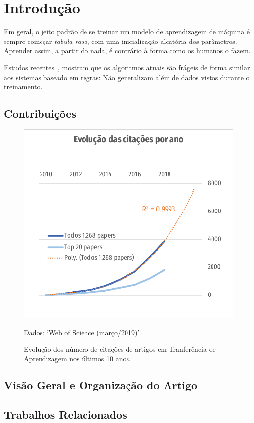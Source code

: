 \documentclass[sigconf]{acmart}
\newcommand{\source}[2]{\raggedleft{}\vspace*{-7mm}\caption*{ \scriptsize{{#1}: {`#2'}}}}
\begin{document}
\section{Introdução} 
  Em geral, o jeito padrão de se treinar um modelo de aprendizagem de máquina é sempre começar \emph{tabula rasa}, com uma inicialização aleatória dos parâmetros. Aprender assim, a partir do nada, é contrário à forma como os humanos o fazem.

  Estudos recentes~\cite{JiaLian2017, BelinkovBisk2018}, mostram que os algoritmos atuais são frágeis de forma similar aos sistemas baseado em regras: Não generalizam além de dados vistos durante o treinamento.
  \lipsum[1]
  \subsection{Contribuições}
  \lipsum[3]
  \begin{figure}[h]
    \includegraphics[width=\columnwidth]{citacoes_por_ano2.pdf}
    \source{Dados}{Web of Science (março/2019)}
    \caption{Evolução dos número de citações de artigos em Tranferência de Aprendizagem nos últimos 10 anos.}
    \label{fig:citacoes_por_ano}
  \end{figure}
  \subsection{Visão Geral e Organização do Artigo}
  \lipsum[3]
  \subsection{Trabalhos Relacionados}
  \lipsum[2]
\end{document}
